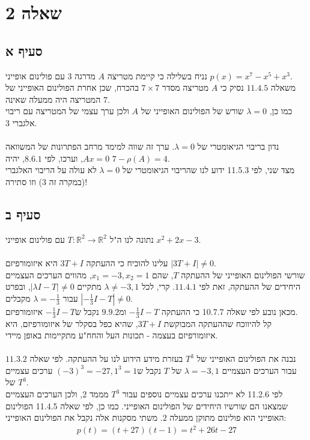 \documentclass{article}
\def\reals{\mathbb{R}}
\begin{document}
\pagebreak

\section*{שאלה 2}

\subsection*{סעיף א}

נניח בשלילה כי קיימת מטריצה $A$ מדרגה 3 עם פולינום אופייני $p(x)=x^7-x^5+x^3$.\\
משאלה $11.4.5$ נסיק כי $A$ מטריצה מסדר $7\times 7$ בהכרח, שכן אחרת הפולינום האופייני של המטריצה היה ממעלה שאינה $7$.\\
כמו כן, $\lambda=0$ שורש של הפולינום האופייני של $A$ ולכן ערך עצמי של המטריצה עם ריבוי אלגברי 3. \\\\
נדון בריבוי הגיאומטרי של $\lambda=0$. ערך זה שווה למימד מרחב הפתרונות של המשוואה $Ax=0$, וערכו, לפי $8.6.1$, יהיה $7-\rho(A)=4$. \\
מצד שני, לפי 11.5.3 ידוע לנו שהריבוי הגיאומטרי של $\lambda=0$ לא עולה על הריבוי האלגברי (במקרה זה 3) וזו סתירה!

\subsection*{סעיף ב}

נתונה לנו ה"ל $T: \reals^2\rightarrow\reals^2$ עם פולינום אופייני $x^2+2x-3$.
\\\\
עלינו להוכיח כי ההעתקה $3T+I$ היא איזומורפיזם $|3T+I|\ne 0$. \\
שורשי הפולינום האופייני של ההעתקה $T$, שהם $x_1=-3, x_2=1$, מהווים הערכים העצמיים היחידים של ההעתקה, זאת לפי $11.4.1$.
קרי, לכל $\lambda\ne -3, 1$ מתקיים $|\lambda I - T|\ne 0$, ובפרט עבור $\lambda=-\frac{1}{3}$ מקבלים $|-\frac{1}{3}I-T|\ne 0$.\\
מכאן נובע לפי שאלה 10.7.7 כי ההעתקה $-\frac{1}{3}I-T$ ומ$9.9.2$ נקבל ש$-\frac{1}{3}I-T$ איזומורפיזם.\\
קל להיווכח שההעתקה המבוקשת $3T+I$, שהיא כפל בסקלר של איזומורפיזם, היא איזומורפיזם בעצמה - תכונות העל והחח"ע מתקיימות באופן מיידי.
\\\\
נבנה את הפולינום האופייני של $T^3$ בעזרת מידע הידוע לנו על ההעתקה. לפי שאלה $11.3.2$ עבור הערכים העצמיים $\lambda=-3,1$ של $T$ נקבל ש$(-3)^3=-27, 1^3=1$ ערכים עצמיים של $T^3$.\\
לפי 11.2.6 לא ייתכנו ערכים עצמיים נוספים עבור $T^3$ מממד $2$, ולכן הערכים העצמיים שמצאנו הם שורשיו היחידים של הפולינום האופייני. כמו כן, לפי שאלה 11.4.5 הפולינום האופייני הוא פולינום מתוקן ממעלה $2$. משתי מסקנות אלה נקבל את הפולינום האופייני:
\begin{align*}
    p(t)=(t+27)(t-1)=t^2+26t-27
\end{align*}
\end{document}
